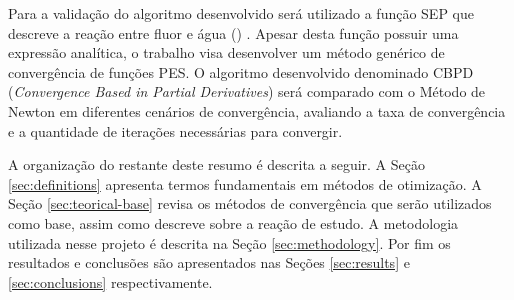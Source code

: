 Para a validação do algoritmo desenvolvido será utilizado a função SEP que descreve a reação entre fluor e água () \cite{fh2o_first_sep}. Apesar desta função possuir uma expressão analítica, o trabalho visa desenvolver um método genérico de convergência de funções PES. O algoritmo desenvolvido denominado CBPD (\textit{Convergence Based in Partial Derivatives}) será comparado com o Método de Newton em diferentes cenários de convergência, avaliando a taxa de convergência e a quantidade de iterações necessárias para convergir.

A organização do restante deste resumo é descrita a seguir. A Seção \ref{sec:definitions} apresenta termos fundamentais em métodos de otimização. A Seção \ref{sec:teorical-base} revisa os métodos de convergência que serão utilizados como base, assim como descreve sobre a reação de estudo. A metodologia utilizada nesse projeto é descrita na Seção \ref{sec:methodology}. Por fim os resultados e conclusões são apresentados nas Seções \ref{sec:results} e \ref{sec:conclusions} respectivamente.

